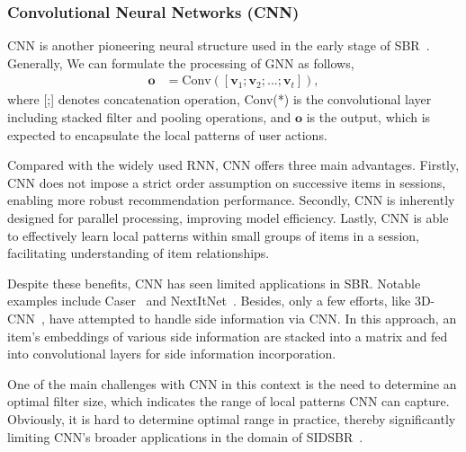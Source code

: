 \documentclass[lettersize,journal]{IEEEtran}
\newcommand{\baby}{{SIDSBR}\xspace}
\begin{document}
\subsubsection{Convolutional Neural Networks (CNN)} CNN is another pioneering neural structure used in the early stage of SBR~\cite{Tuan@RecSys2017, Caser}. Generally, We can formulate the processing of GNN as follows,
\begin{align}
    \mathbf{o} &= \text{Conv}([\mathbf{v}_1;\mathbf{v}_2; ...;\mathbf{v}_t]),
\end{align}
where [;] denotes concatenation operation, Conv(*) is the convolutional layer including stacked filter and pooling operations, and $\mathbf{o}$ is the output, which is expected to encapsulate the local patterns of user actions. 


Compared with the widely used RNN, CNN offers three main advantages. Firstly, CNN does not impose a strict order assumption on successive items in sessions, enabling more robust recommendation performance. Secondly, CNN is inherently designed for parallel processing, improving model efficiency. Lastly, CNN is able to effectively learn local patterns within small groups of items in a session, facilitating understanding of item relationships. 

Despite these benefits, CNN has seen limited applications in SBR. Notable examples include Caser~\cite{Caser} and NextItNet~\cite{Yuan@WSDM2019}. Besides, only a few efforts, like 3D-CNN~\cite{Tuan@RecSys2017}, have attempted to handle side information via CNN. In this approach, an item's embeddings of various side information are stacked into a matrix and fed into convolutional layers for side information incorporation. 

One of the main challenges with CNN in this context is the need to determine an optimal filter size, which indicates the range of local patterns CNN can capture. Obviously, it is hard to determine optimal range in practice, thereby significantly limiting CNN's broader applications in the domain of \baby~\cite{LINet}.
\end{document}
